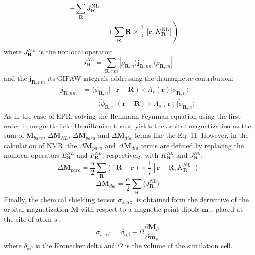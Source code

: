 \documentclass[final,3p,times,twocolumn]{elsarticle}
\begin{document}
\begin{small}
\begin{align}
  + \sum_{\mathbf{R}} J_{\mathbf{R}}^{\rm NL} \nonumber \\
  &\quad + \sum_{\mathbf{R}} \mathbf{R} \times \frac{1}{i}\left[ \mathbf{r}, {K}_\mathbf{R}^{\rm NL} \right] \Bigg)
\end{align} 
where $J_{\mathbf{R}}^{\rm NL}$ is the nonlocal operator: 
\begin{equation}
J_{\mathbf{R}}^{NL}=\sum_{\mathbf{R},nm}^{}|\widetilde{\rho}_{\mathbf{R},n}  \rangle  \mathbf {j}_{\mathbf{R},nm} \langle \widetilde{\rho}_{\mathbf{R},m} |
\end{equation} 
and the $\mathbf {j}_{\mathbf{R},nm}$ its GIPAW integrals addressing the diamagnetic contribution:
\begin{align}
j_{\mathbf{R},nm} &=  \langle\phi_{\mathbf{R},n}|(\mathbf{r-R})\times A_{s}(\mathbf{r}) |\phi_{\mathbf{R},n}\rangle \nonumber \\
&\quad - \langle\widetilde{\phi}_{\mathbf{R},n}|(\mathbf{r-R})\times A_{s}(\mathbf{r}) |\widetilde{\phi}_{\mathbf{R},n}\rangle
\end{align} 
As in the case of EPR, solving the Hellmann-Feynman equation using the first-order in magnetic field Hamiltonian terms, yields the orbital magnetization as the sum of $\mathbf{M}_{bare}$, $\Delta \mathbf{M}_{NL}$, $\Delta \mathbf{M}_{para}$ and $\Delta \mathbf{M}_{dia}$ terms like the Eq. 11. However, in the calculation of NMR, the $\Delta \mathbf{M}_{para}$ and $\Delta \mathbf{M}_{dia}$ terms are defined by replacing the nonlocal operators $E_{\mathbf{R}}^{NL}$ and $F_{\mathbf{R}}^{NL}$, respectively, with $K_{\mathbf{R}}^{NL}$ and $J_{\mathbf{R}}^{NL}$: 
\begin{equation}
\Delta \mathbf{M}_{para}=\frac{\alpha}{2}\sum_{\mathbf{R}}^{}\langle{(\mathbf{R-r})}\times\frac{1}{i} \left[\mathbf{r-R}, {K}_\mathbf{R}^{NL}   \right]      \rangle
\end{equation}  
\begin{equation}
\Delta \mathbf{M}_{dia}=\frac{\alpha}{2}\sum_{\mathbf{R}}^{}\langle{} {J}_\mathbf{R}^{NL}       \rangle
\end{equation} 
Finally, the chemical shielding tensor $\sigma_{s,\alpha\beta}\ $ is obtained form the derivative of the orbital magnetization $\mathbf{M}$ with respect to a magnetic point dipole $\mathbf{m}_{s} $, placed at the site of atom $s$ :
\begin{equation}
\sigma_{s,\alpha\beta}\ = \delta_{\alpha\beta}-\Omega\frac{\partial \mathbf{M}_{\beta}}{\partial \mathbf{m}_{s}}
\end{equation} 
where $\delta_{\alpha\beta}$ is the Kronecker delta and $\Omega$ is the volume of the simulation cell.
\vskip0.5cm

\end{small}
\end{document}
